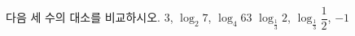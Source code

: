 다음 세 수의 대소를 비교하시오.
 $3$, $\log_2 7$, $\log_4 63$
 $\log_{\frac{1}{3}} 2$, $\log_{\frac{1}{3}} \dfrac{1}{2}$, $-1$
